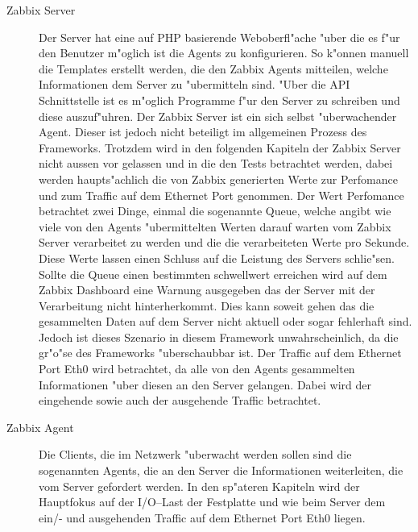 \begin{description}
\item[Zabbix Server]Der Server hat eine auf PHP basierende Weboberfl"ache "uber die es f"ur den Benutzer m"oglich ist die Agents zu %
konfigurieren. So k"onnen manuell die Templates erstellt werden, die den Zabbix Agents mitteilen, welche Informationen dem %
Server zu "ubermitteln sind. %
"Uber die API Schnittstelle ist es m"oglich Programme f"ur den Server zu schreiben und diese auszuf"uhren. %
Der Zabbix Server ist ein sich selbst "uberwachender Agent. Dieser ist jedoch nicht beteiligt %
im allgemeinen Prozess des Frameworks. %
Trotzdem wird in den folgenden Kapiteln der Zabbix Server nicht aussen vor gelassen und in die %
den Tests betrachtet werden, dabei werden haupts"achlich die von Zabbix generierten Werte zur Perfomance und zum %
Traffic auf dem Ethernet Port genommen. Der Wert Perfomance betrachtet zwei Dinge, einmal die sogenannte Queue, welche %
angibt wie viele von den Agents "ubermittelten Werten darauf warten vom Zabbix Server verarbeitet zu werden und die %
die verarbeiteten Werte pro Sekunde. Diese Werte lassen einen Schluss auf die Leistung des Servers schlie"sen. %
Sollte die Queue einen bestimmten schwellwert erreichen wird auf dem Zabbix Dashboard eine Warnung ausgegeben das der %
Server mit der Verarbeitung nicht hinterherkommt. Dies kann soweit gehen das die gesammelten Daten auf dem Server nicht %
aktuell oder sogar fehlerhaft sind. Jedoch ist dieses Szenario in diesem Framework unwahrscheinlich, da die gr"o"se des %
Frameworks "uberschaubbar ist. Der Traffic auf dem Ethernet Port Eth0 wird betrachtet, da alle von den Agents gesammelten Informationen %
"uber diesen an den Server gelangen. Dabei wird der eingehende sowie auch der ausgehende Traffic betrachtet. 

\item[Zabbix Agent]Die Clients, die im Netzwerk "uberwacht werden sollen sind die sogenannten Agents, die an den Server %
die Informationen weiterleiten, die vom Server gefordert werden. In den sp"ateren Kapiteln wird der Hauptfokus auf der %
I/O--Last der Festplatte und wie beim Server dem ein/- und ausgehenden Traffic auf dem Ethernet Port Eth0 liegen. %
\end{description} 


